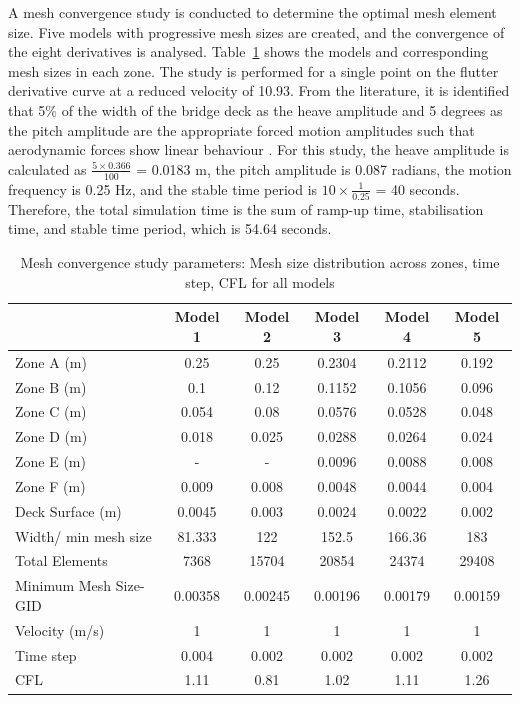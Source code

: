 \documentclass[../main]{subfiles}
\begin{document}
A mesh convergence study is conducted to determine the optimal mesh element size. Five models with progressive 
mesh sizes are created, and the convergence of the eight derivatives is analysed. Table~\ref{tab:mesh_convergence} shows the models
and corresponding mesh sizes in each zone. The study is performed for a single point on the flutter derivative curve
at a reduced velocity of 10.93. From the literature, it is identified that 5$\%$ of the width of the bridge deck as the heave amplitude 
and 5 degrees as the pitch amplitude are the appropriate forced motion amplitudes such that aerodynamic forces show linear behaviour \cite{noda2003, huang2013, brusiani2013, Su2025, Andi2022}. 
For this study, the heave amplitude is calculated as $ \frac{5 \times 0.366}{100} $ = 0.0183 m, the pitch amplitude is 0.087 
radians, the motion frequency is 0.25 Hz, and the stable time period is $ 10 \times \frac{1}{0.25} $ = 40 seconds. 
Therefore, the total simulation time is the sum of ramp-up time, stabilisation time, and stable time period, which is 54.64 seconds. \\

\begin{table}[htbp]  
    \centering
    \caption{Mesh convergence study parameters: Mesh size distribution across zones, time step, CFL for all models}
    \label{tab:mesh_convergence}
    \begin{tabular}{|l|c|c|c|c|c|}
        \hline
        \textbf{} & \textbf{Model 1} & \textbf{Model 2} & \textbf{Model 3} & \textbf{Model 4} & \textbf{Model 5} \\ \hline
        Zone A (m) & 0.25 & 0.25 & 0.2304 & 0.2112 & 0.192 \\ \hline
        Zone B (m) & 0.1 & 0.12 & 0.1152 & 0.1056 & 0.096 \\ \hline
        Zone C (m) & 0.054 & 0.08 & 0.0576 & 0.0528 & 0.048 \\ \hline
        Zone D (m) & 0.018 & 0.025 & 0.0288 & 0.0264 & 0.024 \\ \hline
        Zone E (m) & - & - & 0.0096 & 0.0088 & 0.008 \\ \hline
        Zone F (m) & 0.009 & 0.008 & 0.0048 & 0.0044 & 0.004 \\ \hline
        Deck Surface (m) & 0.0045 & 0.003 & 0.0024 & 0.0022 & 0.002 \\ \hline
        Width/ min mesh size & 81.333 & 122 & 152.5 & 166.36 & 183 \\ \hline
        Total Elements & 7368 & 15704 & 20854 & 24374 & 29408 \\ \hline
        Minimum Mesh Size-GID & 0.00358 & 0.00245 & 0.00196 & 0.00179 & 0.00159 \\ \hline
        Velocity (m/s) & 1 & 1 & 1 & 1 & 1 \\ \hline
        Time step & 0.004 & 0.002 & 0.002 & 0.002 & 0.002 \\ \hline
        CFL & 1.11 & 0.81 & 1.02 & 1.11 & 1.26 \\ \hline
    \end{tabular}
\end{table}
\end{document}
